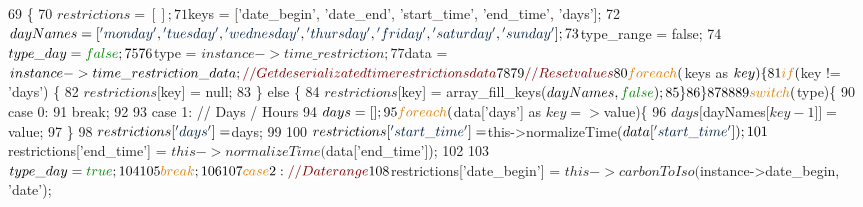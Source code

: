 \begin{DoxyCode}
69     \{
70         $restrictions = [];
71         $keys         = [\textcolor{stringliteral}{'date\_begin'}, \textcolor{stringliteral}{'date\_end'}, \textcolor{stringliteral}{'start\_time'}, \textcolor{stringliteral}{'end\_time'}, \textcolor{stringliteral}{'days'}];
72         $dayNames     = [\textcolor{stringliteral}{'monday'}, \textcolor{stringliteral}{'tuesday'}, \textcolor{stringliteral}{'wednesday'}, \textcolor{stringliteral}{'thursday'}, \textcolor{stringliteral}{'friday'}, \textcolor{stringliteral}{'saturday'}, \textcolor{stringliteral}{'sunday'}];
73         $type\_range   = \textcolor{keyword}{false};
74         $type\_day     = \textcolor{keyword}{false};
75         
76         $type         = $instance->time\_restriction;
77         $data         = $instance->time\_restriction\_data; \textcolor{comment}{// Get deserializated time restrictions data}
78         
79         \textcolor{comment}{// Reset values}
80         \textcolor{keywordflow}{foreach}($keys as $key)\{
81             \textcolor{keywordflow}{if} ($key != \textcolor{stringliteral}{'days'}) \{
82                 $restrictions[$key] = null;
83             \} \textcolor{keywordflow}{else} \{
84                 $restrictions[$key] = array\_fill\_keys($dayNames, \textcolor{keyword}{false});
85             \}
86         \}
87 
88                
89         \textcolor{keywordflow}{switch}($type)\{
90             \textcolor{keywordflow}{case} 0:
91                 \textcolor{keywordflow}{break};
92             
93             \textcolor{keywordflow}{case} 1: \textcolor{comment}{// Days / Hours}
94                 $days = [];
95                 \textcolor{keywordflow}{foreach}($data[\textcolor{stringliteral}{'days'}] as $key => $value)\{
96                     $days[ $dayNames[$key-1] ] = $value;
97                 \}
98                 $restrictions[\textcolor{stringliteral}{'days'}] = $days;
99 
100                 $restrictions[\textcolor{stringliteral}{'start\_time'}] = $this->normalizeTime($data[\textcolor{stringliteral}{'start\_time'}]);
101                 $restrictions[\textcolor{stringliteral}{'end\_time'}]   = $this->normalizeTime($data[\textcolor{stringliteral}{'end\_time'}]);
102                 
103                 $type\_day = \textcolor{keyword}{true};
104                 
105                 \textcolor{keywordflow}{break};
106             
107             \textcolor{keywordflow}{case} 2: \textcolor{comment}{// Date range}
108                 $restrictions[\textcolor{stringliteral}{'date\_begin'}] = $this->carbonToIso($instance->date\_begin, \textcolor{stringliteral}{'date'});

\end{DoxyCode}
